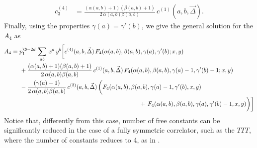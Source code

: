 \documentclass[a4paper,11pt,openright,twoside]{book}
\let\a=\alpha   \let\b=\beta   \let\g=\gamma   \let\d=\delta
\numberwithin{equation}{section}
\begin{document}
{{{\begin{align}
	c_3^{(4)}&=\frac{(\a(a,b)+1)(\b(a,b)+1)}{2\,\a(a,b)\b(a,b)}\,c^{(1)}(a,b,\vec{\Delta}).
\end{align}
Finally, using the properties $\g(a)=\g'(b)$, we give the general solution for the $A_4$ as
\begin{align}
	A_4&=p_1^{\D-2d}\,\sum_{ab}\,x^a\,y^b\bigg[c^{(4)}(a,b,\vec{\Delta})\,F_4(\a(a,b),\b(a,b),\g(a),\g'(b);x,y)\notag\\
	&\hspace{0.5cm}+\frac{(\a(a,b)+1)(\b(a,b)+1)}{2\,\a(a,b)\b(a,b)}\,c^{(1)}(a,b,\vec{\Delta})\,F_4(\a(a,b),\b(a,b),\g(a)-1,\g'(b)-1;x,y)\notag\\
	&\hspace{0.5cm}-\frac{(\g(a)-1)}{2\,\a(a,b)\b(a,b)}\,c^{(3)}(a,b,\vec{\Delta})\,\bigg(F_4(\alpha(a,b),\beta(a,b),\gamma(a)-1,\gamma'(b),x,y)\notag\\
	&\hspace{7.5cm}+\,F_4(\alpha(a,b),\beta(a,b),\gamma(a),\gamma'(b)-1,x,y)\bigg)
	\bigg]
\end{align}
Notice that, differently from this case, number of free constants can be significantly reduced in the case of a fully symmetric correlator, such as the $TTT$, where the  number of constants reduces to 4, as in \cite{Bzowski:2011ab}.   
}}}
\end{document}
